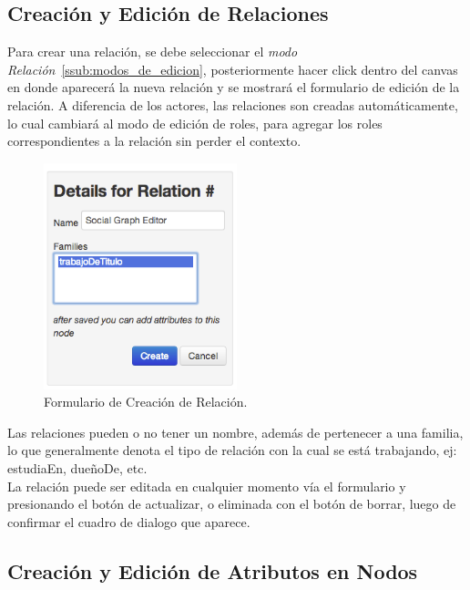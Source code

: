 \subsection{Creación y Edición de Relaciones} %
\label{sub:creacion_y_edicion_de_relaciones}

Para crear una relación, se debe seleccionar el \emph{modo Relación}~\ref{ssub:modos_de_edicion}, posteriormente hacer click dentro del canvas en donde aparecerá la nueva relación y se mostrará el formulario de edición de la relación. A diferencia de los actores, las relaciones son creadas automáticamente, lo cual cambiará al modo de edición de roles, para agregar los roles correspondientes a la relación sin perder el contexto.

\begin{figure}[H]
  \centering
  \includegraphics[width=0.5\textwidth]{images/creacion_relacion.png}
  \caption{Formulario de Creación de Relación.}
  \label{creacion_relacion}
\end{figure}

Las relaciones pueden o no tener un nombre, además de pertenecer a una familia, lo que generalmente denota el tipo de relación con la cual se está trabajando, ej: estudiaEn, dueñoDe, etc.\\

La relación puede ser editada en cualquier momento vía el formulario y presionando el botón de actualizar, o eliminada con el botón de borrar, luego de confirmar el cuadro de dialogo que aparece.


\subsection{Creación y Edición de Atributos en Nodos} %
\label{sub:creacion_y_edicion_de_atributos_en_nodos}

